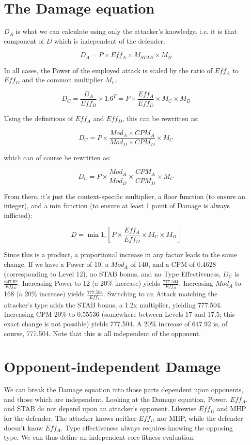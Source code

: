 \section{The Damage equation}

$D_A$ is what we can calculate using only the attacker's knowledge, i.e.
 it is that component of $D$ which is independent of the defender.

\[ D_A = P \times Eff_A \times M_{STAB} \times M_B \]

In all cases, the Power of the employed attack is scaled by the ratio of
 $Eff_A$ to $Eff_D$ and the common multiplier $M_C$.

\[ D_C = \frac{D_A}{Eff_D} \times 1.6^T = P \times \frac{Eff_A}{Eff_D} \times M_C \times M_B \]

Using the definitions of $Eff_A$ and $Eff_D$, this can be rewritten as:

\[ D_C = P \times \frac{Mod_A \times CPM_A}{Mod_D \times CPM_D} \times M_C \]

which can of course be rewritten as:

\[ D_C = P \times \frac{Mod_A}{Mod_D} \times \frac{CPM_A}{CPM_D} \times M_C \]

From there, it's just the context-specific multiplier, a floor function (to ensure
 an integer), and a min function (to ensure at least 1 point of Damage
 is always inflicted):

\[ D = \min{1, \left\lfloor P \times \frac{Eff_A}{Eff_D} \times M_C \times M_B \right\rfloor } \]

Since this is a product, a proportional increase in any factor leads to
 the same change.
If we have a Power of 10, a $Mod_A$ of 140, and a CPM of 0.4628 (corresponding
 to Level 12), no STAB bonus, and no Type Effectiveness, $D_C$ is $\frac{647.92}{Eff_D}$.
Increasing Power to 12 (a 20\% increase) yields $\frac{777.504}{Eff_D}$.
Increasing $Mod_A$ to 168 (a 20\% increase) yields $\frac{777.504}{Eff_D}$.
Switching to an Attack matching the attacker's type adds the
 STAB bonus, a 1.2x multiplier, yielding 777.504.
Increasing CPM 20\% to 0.55536 (somewhere between Levels 17 and 17.5; this
 exact change is not possible) yields 777.504.
A 20\% increase of 647.92 is, of course, 777.504.
Note that this is all independent of the opponent.

\section{Opponent-independent Damage}
We can break the Damage equation into those parts dependent
 upon opponents, and those which are independent.
Looking at the Damage equation, Power, $Eff_A$, and STAB do not depend
 upon an attacker's opponent.
Likewise $Eff_D$ and MHP for the defender.
The attacker knows neither $Eff_D$ nor MHP, while the defender doesn't know $Eff_A$.
Type effectiveness always requires knowing the opposing type.
We can thus define an independent core fitness evaluation:

